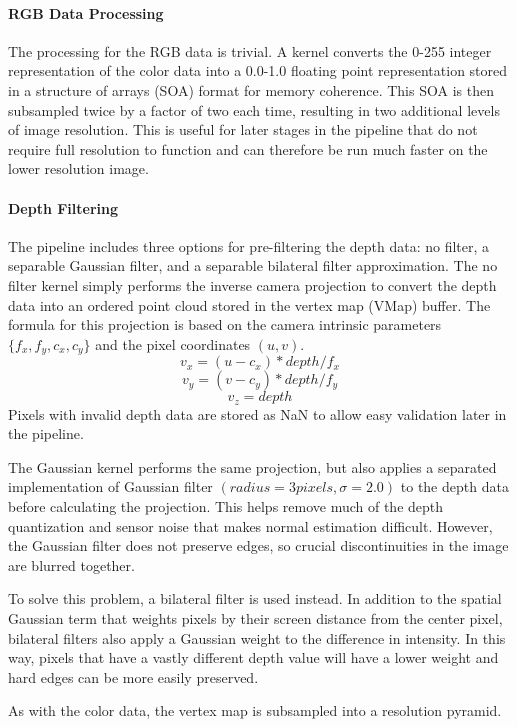 \paragraph{RGB Data Processing} 
The processing for the RGB data is trivial. A kernel converts the 0-255 integer representation of the color data into a 0.0-1.0 floating point representation stored in a structure of arrays (SOA) format for memory coherence. This SOA is then subsampled twice by a factor of two each time, resulting in two additional levels of image resolution. This is useful for later stages in the pipeline that do not require full resolution to function and can therefore be run much faster on the lower resolution image.
\paragraph{Depth Filtering}
The pipeline includes three options for pre-filtering the depth data: no filter, a separable Gaussian filter, and a separable bilateral filter approximation\cite{pham2005separable}. The no filter kernel simply performs the inverse camera projection to convert the depth data into an ordered point cloud stored in the vertex map (VMap) buffer. The formula for this projection is based on the camera intrinsic parameters $\{f_x,f_y,c_x,c_y\}$ and the pixel coordinates $(u,v)$.
$$v_x = (u - c_x) * depth / f_x$$
$$v_y = (v - c_y) * depth / f_y$$
$$v_z = depth$$
Pixels with invalid depth data are stored as NaN to allow easy validation later in the pipeline.\par 
The Gaussian kernel performs the same projection, but also applies a separated implementation of Gaussian filter  $(radius=3 pixels,\sigma=2.0)$ to the depth data before calculating the projection. This helps remove much of the depth quantization and sensor noise that makes normal estimation difficult. However, the Gaussian filter does not preserve edges, so crucial discontinuities in the image are blurred together.\par 
To solve this problem, a bilateral filter is used instead. In addition to the spatial Gaussian term that weights pixels by their screen distance from the center pixel, bilateral filters also apply a Gaussian weight to the difference in intensity. In this way, pixels that have a vastly different depth value will have a lower weight and hard edges can be more easily preserved.\par 
As with the color data, the vertex map is subsampled into a resolution pyramid.
